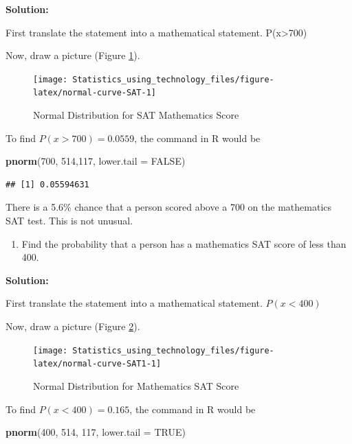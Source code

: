 \documentclass[
]{book}
\newenvironment{Shaded}{\begin{snugshade}}{\end{snugshade}}
\newcommand{\DataTypeTok}[1]{\textcolor[rgb]{0.13,0.29,0.53}{#1}}
\newcommand{\DecValTok}[1]{\textcolor[rgb]{0.00,0.00,0.81}{#1}}
\newcommand{\KeywordTok}[1]{\textcolor[rgb]{0.13,0.29,0.53}{\textbf{#1}}}
\newcommand{\NormalTok}[1]{#1}
\newcommand{\OtherTok}[1]{\textcolor[rgb]{0.56,0.35,0.01}{#1}}
\providecommand{\tightlist}{%
  \setlength{\itemsep}{0pt}\setlength{\parskip}{0pt}}
\begin{document}
\textbf{Solution:}

First translate the statement into a mathematical statement. P(x\textgreater700)

Now, draw a picture (Figure \ref{fig:normal-curve-SAT}).



\begin{figure}
\texttt{[image: Statistics\_using\_technology\_files/figure-latex/normal-curve-SAT-1]} \caption{Normal Distribution for SAT Mathematics Score}\label{fig:normal-curve-SAT}
\end{figure}

To find \(P(x>700)=0.0559\), the command in R would be

\begin{Shaded}
\begin{Highlighting}[]
\KeywordTok{pnorm}\NormalTok{(}\DecValTok{700}\NormalTok{, }\DecValTok{514}\NormalTok{,}\DecValTok{117}\NormalTok{, }\DataTypeTok{lower.tail =} \OtherTok{FALSE}\NormalTok{)}
\end{Highlighting}
\end{Shaded}

\begin{verbatim}
## [1] 0.05594631
\end{verbatim}

There is a 5.6\% chance that a person scored above a 700 on the mathematics SAT test. This is not unusual.

\begin{enumerate}
\def\labelenumi{\alph{enumi}.}
\setcounter{enumi}{2}
\tightlist
\item
  Find the probability that a person has a mathematics SAT score of less than 400.
\end{enumerate}

\textbf{Solution:}

First translate the statement into a mathematical statement. \(P(x<400)\)

Now, draw a picture (Figure \ref{fig:normal-curve-SAT1}).



\begin{figure}
\texttt{[image: Statistics\_using\_technology\_files/figure-latex/normal-curve-SAT1-1]} \caption{Normal Distribution for Mathematics SAT Score}\label{fig:normal-curve-SAT1}
\end{figure}

To find \(P(x<400)=0.165\), the command in R would be

\begin{Shaded}
\begin{Highlighting}[]
\KeywordTok{pnorm}\NormalTok{(}\DecValTok{400}\NormalTok{, }\DecValTok{514}\NormalTok{, }\DecValTok{117}\NormalTok{, }\DataTypeTok{lower.tail =} \OtherTok{TRUE}\NormalTok{)}
\end{Highlighting}
\end{Shaded}
\end{document}
